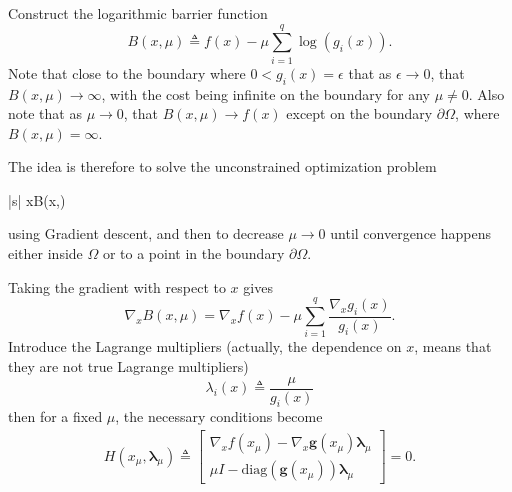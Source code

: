 \documentclass{article}
\begin{document}
	Construct the logarithmic barrier function
	\[
	B(x, \mu) \triangleq f(x) - \mu\sum_{i=1}^q \log(g_i(x)).
	\]
	Note that close to the boundary where $0<g_i(x)=\epsilon$ that as $\epsilon\to 0$, that $B(x,\mu)\to\infty$, with the cost being infinite on the boundary for any $\mu\neq 0$. 
	Also note that as $\mu\to 0$, that $B(x,\mu)\to f(x)$ except on the boundary $\partial\Omega$, where $B(x,\mu)=\infty$.  
	
	The idea is therefore to solve the unconstrained optimization problem 
		\begin{mini*}|s|
				{x\in\Omega}{B(x,\mu)}{}{}
		\end{mini*}
	using Gradient descent, and then to decrease $\mu\to 0$ until convergence happens either inside $\Omega$ or to a point in the boundary $\partial\Omega$.
	
	
	Taking the gradient with respect to $x$ gives
	\[
	\nabla_x B(x, \mu) = \nabla_x f(x) - \mu\sum_{i=1}^q \frac{\nabla_x g_i(x)}{g_i(x)}.
	\]	
	Introduce the Lagrange multipliers (actually, the dependence on $x$, means that they are not true Lagrange multipliers)
	\[
	\lambda_i(x) \triangleq \frac{\mu}{g_i(x)}
	\]
	then for a fixed $\mu$, the necessary conditions become
	\begin{align*}
	H(x_\mu, \boldsymbol{\lambda}_{\mu}) \triangleq 
		\begin{bmatrix}
 			\nabla_x f(x_\mu) - \nabla_x \mathbf{g}(x_\mu) \boldsymbol{\lambda}_\mu \\
 			\mu I - \text{diag}(\mathbf{g}(x_\mu))\boldsymbol{\lambda}_{\mu}
 		\end{bmatrix} = 0.
	\end{align*}
	
\end{document}
